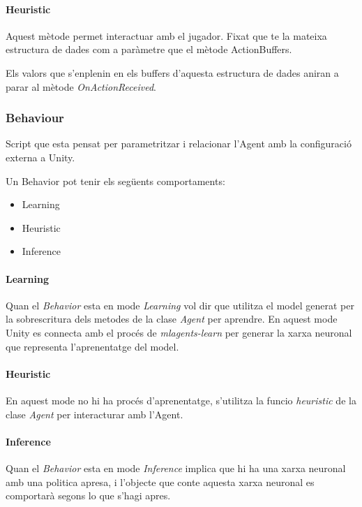 \documentclass{article}
\begin{document}
    
    \paragraph{Heuristic}
    Aquest mètode permet interactuar amb el jugador. Fixat que te la mateixa estructura de dades com a paràmetre que el mètode ActionBuffers.
    
    Els valors que s'enplenin en els buffers d'aquesta estructura de dades aniran a parar al mètode \textit{OnActionReceived}.
    
    \subsubsection{Behaviour}
    Script que esta pensat per parametritzar i relacionar l’Agent amb la configuració externa a Unity.
    
    Un Behavior pot tenir els següents comportaments:
    \begin{itemize}
        \item Learning
        \item Heuristic
        \item Inference
    \end{itemize}
    
    \paragraph{Learning}
    Quan el \textit{Behavior} esta en mode \textit{Learning} vol dir que utilitza el model generat per la sobrescritura dels metodes de la clase \textit{Agent} per aprendre. En aquest mode Unity es connecta amb el procés de \textit{mlagents-learn} per generar la xarxa neuronal que representa l'aprenentatge del model.
    
    \paragraph{Heuristic}
    En aquest mode no hi ha procés d'aprenentatge, s'utilitza la funcio \textit{heuristic} de la clase \textit{Agent} per interacturar amb l'Agent.
    
    \newpage
    
    \paragraph{Inference}
    Quan el \textit{Behavior} esta en mode \textit{Inference} implica que hi ha una xarxa neuronal amb una politica apresa, i l'objecte que conte aquesta xarxa neuronal es comportarà segons lo que s'hagi apres.
    
\end{document}
